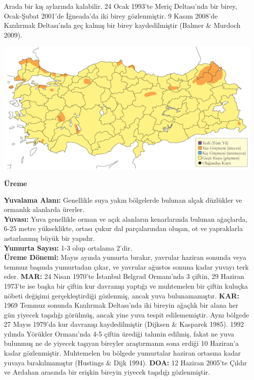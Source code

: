 \documentclass[
  letterpaper,
  DIV=11,
  numbers=noendperiod]{scrreprt}
\begin{document}
Arada bir kış aylarında kalabilir. 24 Ocak 1993'te Meriç Deltası'nda bir
birey, Ocak-Şubat 2001'de İğneada'da iki birey gözlenmiştir. 9 Kasım
2008'de Kızılırmak Deltası'nda geç kalmış bir birey kaydedilmiştir
(Balmer \& Murdoch 2009).

\includegraphics{images/harita_Page_091.png}

\textbf{Üreme}

\textbf{Yuvalama Alanı:} Genellikle suya yakın bölgelerde bulunan alçak
düzlükler ve ormanlık alanlarda ürerler.\\
\textbf{Yuvası:} Yuva genellikle orman ve açık alanların kenarlarında
bulunan ağaçlarda, 6-25 metre yükseklikte, ortası çukur dal
parçalarından oluşan, ot ve yapraklarla astarlanmış büyük bir yapıdır.\\
\textbf{Yumurta Sayısı:} 1-3 olup ortalama 2'dir.\\
\textbf{Üreme Dönemi:} Mayıs ayında yumurta bırakır, yavrular haziran
sonunda veya temmuz başında yumurtadan çıkar, ve yavrular ağustos sonuna
kadar yuvayı terk eder. \textbf{MAR:} 24 Nisan 1970'te İstanbul Belgrad
Ormanı'nda 3 çiftin, 29 Haziran 1973'te ise başka bir çiftin kur
davranışı yaptığı ve muhtemelen bir çiftin kuluçka nöbeti değişimi
gerçekleştirdiği gözlenmiş, ancak yuva bulunamamıştır. \textbf{KAR:}
1969 Temmuz sonunda Kızılırmak Deltası'nda iki bireyin ağaçlık bir alana
her gün yiyecek taşıdığı görülmüş, ancak yine yuva tespit edilememiştir.
Aynı bölgede 27 Mayıs 1979'da kur davranışı kaydedilmiştir (Dijksen \&
Kasparek 1985). 1992 yılında Yörükler Ormanı'nda 4-5 çiftin ürediği
tahmin edilmiş, fakat ne yuva bulunmuş ne de yiyecek taşıyan bireyler
araştırmanın sona erdiği 10 Haziran'a kadar gözlenmiştir. Muhtemelen bu
bölgede yumurtalar haziran ortasına kadar yuvaya bırakılmamıştır
(Hustings \& Dijk 1994). \textbf{DOA:} 12 Haziran 2005'te Çıldır ve
Ardahan arasında bir erişkin bireyin yiyecek taşıdığı gözlenmiştir.
\end{document}
